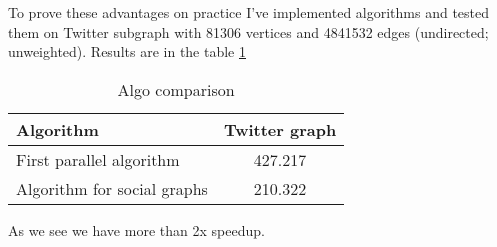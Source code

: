 To prove these advantages on practice I've implemented algorithms and tested them on Twitter subgraph with 81306 vertices and 4841532 edges (undirected; unweighted). Results are in the table \ref{table:algo_floyd_comparison} 


\FloatBarrier
\begin{table}[H]
\centering

\begin{tabular}{l|c}  
Algorithm & Twitter graph\\
\hline\hline
First parallel algorithm & 427.217 \\  
Algorithm for social graphs & 210.322  \\
\hline
\end{tabular}

\caption{Algo comparison}
\label {table:algo_floyd_comparison}
\end{table}
\FloatBarrier

As we see we have more than 2x speedup. 
 
\FloatBarrier
